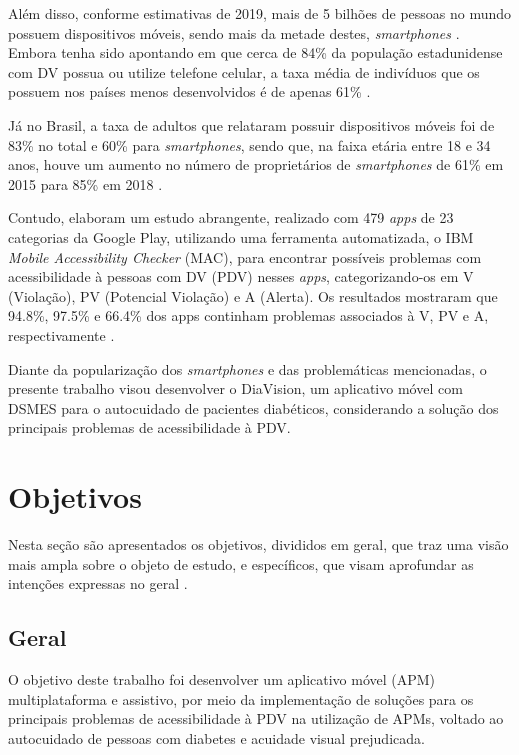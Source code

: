 Além disso, conforme estimativas de 2019, mais de 5 bilhões de pessoas no mundo possuem dispositivos móveis, sendo mais da metade destes, \textit{smartphones}
\cite{Taylor2019}. Embora tenha sido apontando em  que cerca de 84\% da população estadunidense com DV possua ou utilize
telefone celular, a taxa média de indivíduos que os possuem nos países menos desenvolvidos é de apenas 61\% \cite{ITU_2021}.

Já no Brasil, a taxa de adultos que relataram possuir dispositivos móveis foi de 83\% no total e 60\% para \textit{smartphones},
sendo que, na faixa etária entre 18 e 34 anos, houve um aumento no número de proprietários de \textit{smartphones} de
61\% em 2015 para 85\% em 2018 \cite{Taylor2019}.

Contudo,  elaboram um estudo abrangente, realizado com 479 \textit{apps} de 23 categorias da
Google Play, utilizando uma ferramenta automatizada, o IBM \textit{Mobile Accessibility Checker}
(MAC), para encontrar possíveis problemas com acessibilidade à pessoas com DV (PDV) nesses \textit{apps},
categorizando-os em V (Violação), PV (Potencial Violação) e A (Alerta). Os resultados mostraram que 94.8\%, 97.5\% e 66.4\% dos apps continham problemas
associados à V, PV e A, respectivamente \cite{Yan2019}.

Diante da popularização dos \emph{smartphones} e das problemáticas mencionadas, o presente trabalho visou desenvolver o DiaVision, um aplicativo móvel
com DSMES para o autocuidado de pacientes diabéticos, considerando a solução dos principais problemas de acessibilidade à PDV\@.

\section{Objetivos}

Nesta seção são apresentados os objetivos, divididos em geral, que traz uma visão mais ampla sobre o objeto
de estudo, e específicos, que visam aprofundar as intenções expressas no geral \cite{cervo2006metodologia}.

\subsection{Geral}

O objetivo deste trabalho foi desenvolver um aplicativo móvel (APM) multiplataforma e assistivo, por meio da implementação de soluções para os principais problemas de acessibilidade à PDV na utilização de APMs, voltado ao autocuidado de pessoas com diabetes e acuidade visual prejudicada.

